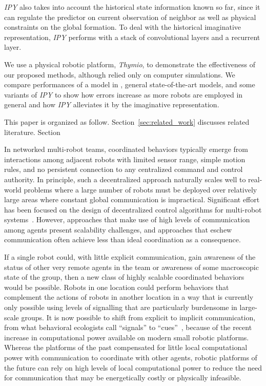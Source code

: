 \documentclass[letterpaper, 10 pt, conference]{ieeeconf}  %
\begin{document}
	\emph{IPY} also takes into account the historical state information known so far, 
	since it can regulate the predictor on current observation of neighbor as well as
	physical constraints on the global formation. To deal with the historical imaginative 
	representation, \emph{IPY} performs with a stack of convolutional layers and a recurrent
	layer. 
		
	We use a physical robotic platform, \emph{Thymio}, to demonstrate the effectiveness of 
	our proposed methods, although \cite{Choi17} relied only on computer simulations.
	We compare performances of a model in \cite{Choi17}, general state-of-the-art models, 
	and some variants of \emph{IPY} to show how errors increase as more robots are employed in 
	general and how \emph{IPY} alleviates it by the imaginative representation. 
	
	This paper is organized as follow. 
	Section~\ref{sec:related_work} discusses related literature. 
	Section~
	
	In networked multi-robot teams, coordinated behaviors typically emerge
	from interactions among adjacent robots with limited sensor range,
	simple motion rules, and no persistent connection to any centralized
	command and control authority. In principle, such a decentralized
	approach naturally scales well to real-world problems where a large
	number of robots must be deployed over relatively large areas where
	constant global communication is impractical. Significant effort has
	been focused on the design of decentralized control algorithms for
	multi-robot systems~\cite{%
		WK02, %
		CM04, %
		OA10, %
		NK11, %
		BFBD13, %
		RCN14, %
		WPKBPB14, %
		DGRSST14, %
		YDJH15, %
		VHD15, %
		VH15, %
		EB16, %
		VFHD16%
	}. However,
	approaches that make use of high levels of communication among agents
	present scalability challenges, and approaches that eschew communication
	often achieve less than ideal coordination as a consequence.
	
	If a single robot could, with little explicit communication, gain
	awareness of the status of other very remote agents in the team or
	awareness of some macroscopic state of the group, then a new class of
	highly scalable coordinated behaviors would be possible. Robots in one
	location could perform behaviors that complement the actions of robots
	in another location in a way that is currently only possible using
	levels of signalling that are particularly burdensome in large-scale
	groups. It is now possible to shift from explicit to implicit
	communication, from what behavioral ecologists call ``signals'' to
	``cues''~\cite{BV11}, because of the recent increase in computational
	power available on modern small robotic platforms. Whereas the platforms
	of the past compensated for little local computational power with
	communication to coordinate with other agents, robotic platforms of the
	future can rely on high levels of local computational power to reduce
	the need for communication that may be energetically costly or
	physically infeasible.
	
\end{document}

